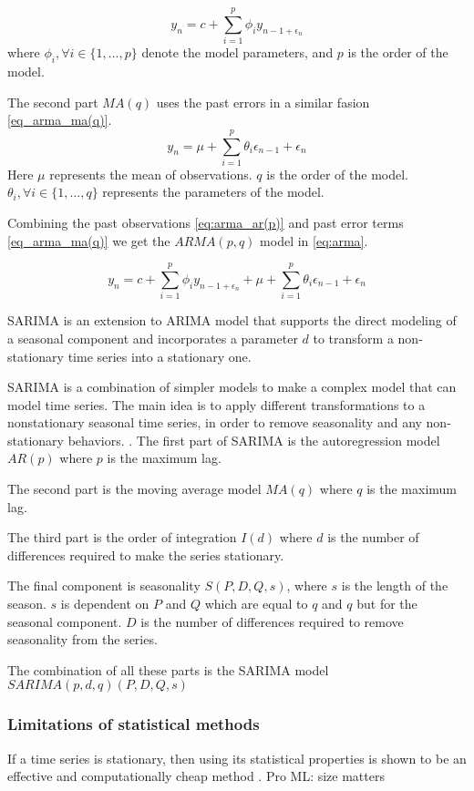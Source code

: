 \begin{equation}
    \label{eq:arma_ar(p)}
    y_n = c + \sum_{i=1}^{p} \phi_i y_{n-1 + \epsilon_n}
\end{equation}
  where $\phi_i, \forall i \in \{1, ..., p\} $ denote the model parameters, and $p$ is the order of the model.

The second part $MA(q)$ uses the past errors in a similar fasion \autoref{eq_arma_ma(q)}.
\begin{equation}
    \label{eq_arma_ma(q)}
    y_n = \mu + \sum_{i=1}^{p} \theta_i \epsilon_{n-1} + \epsilon_n
\end{equation}
Here $\mu$ represents the mean of observations. $q$ is the order of the model. $\theta_i, \forall i \in \{1, ..., q\}$ represents the parameters of the model.

Combining the past observations \autoref{eq:arma_ar(p)} and past error terms \autoref{eq_arma_ma(q)} we get the $ARMA(p,q)$ model in \autoref{eq:arma}.

\begin{equation}
    \label{eq:arma}
    y_n = c + \sum_{i=1}^{p} \phi_i y_{n-1 + \epsilon_n} + \mu + \sum_{i=1}^{p} \theta_i \epsilon_{n-1} + \epsilon_n
\end{equation}

SARIMA is an extension to ARIMA model that supports the direct modeling of a seasonal component and incorporates a parameter $d$
to transform a non-stationary time series into a stationary one.

SARIMA is a combination of simpler models to make a complex model that can model time series.
The main idea is to apply different transformations to a nonstationary seasonal time series,
in order to remove seasonality and any non-stationary behaviors.
\citet[p. 327-385]{Utlaut2008}.
The first part of SARIMA is the autoregression model
$AR(p)$ where $p$ is the maximum lag.

The second part is the moving average model $MA(q)$ where $q$ is the maximum lag.

The third part is the order of integration $I(d)$ where $d$ is the number of
differences required to make the series stationary.

The final component is seasonality $S(P, D, Q, s)$, where $s$ is the length
of the season.
$s$ is dependent on $P$ and $Q$ which are equal to $q$ and $q$ but for the seasonal component.
$D$ is the number of differences required to remove seasonality from the series.

The combination of all these parts is the SARIMA model $SARIMA(p, d, q)(P, D, Q, s)$

\subsubsection{Limitations of statistical methods}
If a time series is stationary, then using its statistical properties is shown to be an effective and computationally cheap method \cite{Makridakis2018}.
Pro ML: size matters \cite{Cerqueira2019}